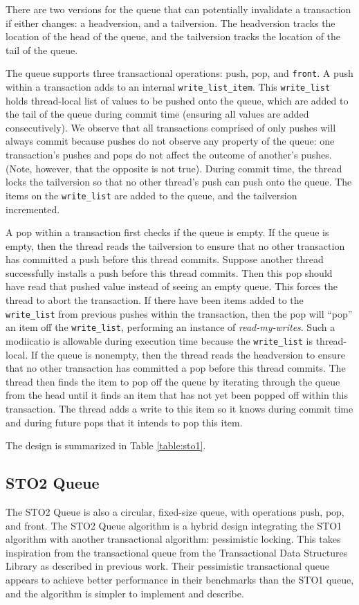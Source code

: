 There are two versions for the queue that can potentially invalidate a transaction if either changes: a headversion, and a tailversion. The headversion tracks the location of the head of the queue, and the tailversion tracks the location of the tail of the queue.

The queue supports three transactional operations: push, pop, and \texttt{front}. A push within a transaction adds to an internal \texttt{write\_list\_item}. This \texttt{write\_list} holds thread-local list of values to be pushed onto the queue, which are added to the tail of the queue during commit time (ensuring all values are added consecutively). We observe that all transactions comprised of only pushes will always commit because pushes do not observe any property of the queue: one transaction's pushes and pops do not affect the outcome of another's pushes. (Note, however, that the opposite is not true). During commit time, the thread locks the tailversion so that no other thread's push can push onto the queue. The items on the \texttt{write\_list} are added to the queue, and the tailversion incremented.

A pop within a transaction first checks if the queue is empty. If the queue is empty, then the thread reads the tailversion to ensure that no other transaction has committed a push before this thread commits. Suppose another thread successfully installs a push before this thread commits. Then this pop should have read that pushed value instead of seeing an empty queue. This forces the thread to abort the transaction. If there have been items added to the \texttt{write\_list} from previous pushes within the transaction, then the pop will “pop” an item off the \texttt{write\_list}, performing an instance of \emph{read-my-writes}. Such a modiicatio is allowable during execution time because the \texttt{write\_list} is thread-local. If the queue is nonempty, then the thread reads the headversion to ensure that no other transaction has committed a pop before this thread commits. The thread then finds the item to pop off the queue by iterating through the queue from the head until it finds an item that has not yet been popped off within this transaction. The thread adds a write to this item so it knows during commit time and during future pops that it intends to pop this item.

The design is summarized in Table \ref{table:sto1}.

\subsection{STO2 Queue}
The STO2 Queue is also a circular, fixed-size queue, with operations push, pop, and front. The STO2 Queue algorithm is a hybrid design integrating the STO1 algorithm with another transactional algorithm: pessimistic locking. This takes inspiration from the transactional queue from the Transactional Data Structures Library\cite{TDSL} as described in previous work. Their pessimistic transactional queue appears to achieve better performance in their benchmarks than the STO1 queue, and the algorithm is simpler to implement and describe. 

